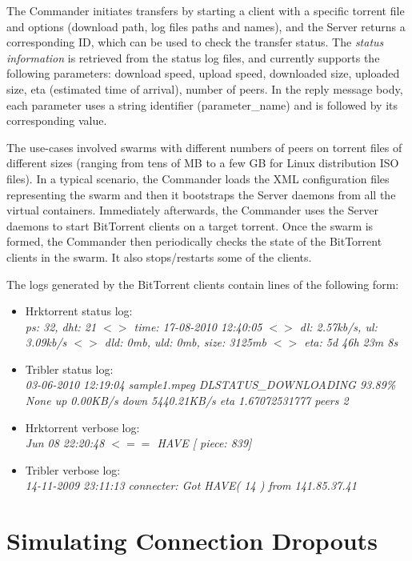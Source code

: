 The Commander initiates transfers by starting a client with a specific torrent
file and options (download path, log files paths and names), and the Server
returns a corresponding ID, which can be used to check the transfer status.
The \textit{status information} is retrieved from the status log files, and
currently supports the following parameters: download speed, upload speed,
downloaded size, uploaded size, eta (estimated time of arrival), number of
peers. In the reply message body, each parameter uses a string identifier
(parameter_name) and is followed by its corresponding value.

The use-cases involved swarms with different numbers of peers on torrent files
of different sizes (ranging from tens of MB to a few GB for Linux distribution
ISO files). In a typical scenario, the Commander loads the XML configuration
files representing the swarm and then it bootstraps the Server daemons from
all the virtual containers. Immediately afterwards, the Commander uses the
Server daemons to start BitTorrent clients on a target torrent. Once the swarm
is formed, the Commander then periodically checks the state of the BitTorrent
clients in the swarm. It also stops/restarts some of the clients.

The logs generated by the BitTorrent clients contain lines of the following
form:

\begin{itemize}
  \item Hrktorrent status log:\\
  \textit{ ps: 32, dht: 21 $<>$ time: 17-08-2010 12:40:05 $<>$ dl: 2.57kb/s,
  ul: 3.09kb/s $<>$ dld: 0mb, uld: 0mb, size: 3125mb $<>$ eta: 5d 46h 23m 8s}
  \item Tribler status log:\\
  \textit{03-06-2010 12:19:04 sample1.mpeg DLSTATUS_DOWNLOADING 93.89\% None
  up 0.00KB/s down  5440.21KB/s eta 1.67072531777 peers 2}
  \item Hrktorrent verbose log:\\
  \textit{Jun 08 22:20:48 $<==$ HAVE [ piece: 839]}
  \item Tribler verbose log:\\
  \textit{14-11-2009 23:11:13 connecter: Got HAVE( 14 ) from 141.85.37.41}
\end{itemize}

\section{Simulating Connection Dropouts}
\label{sec:virt-infra:dropouts}

